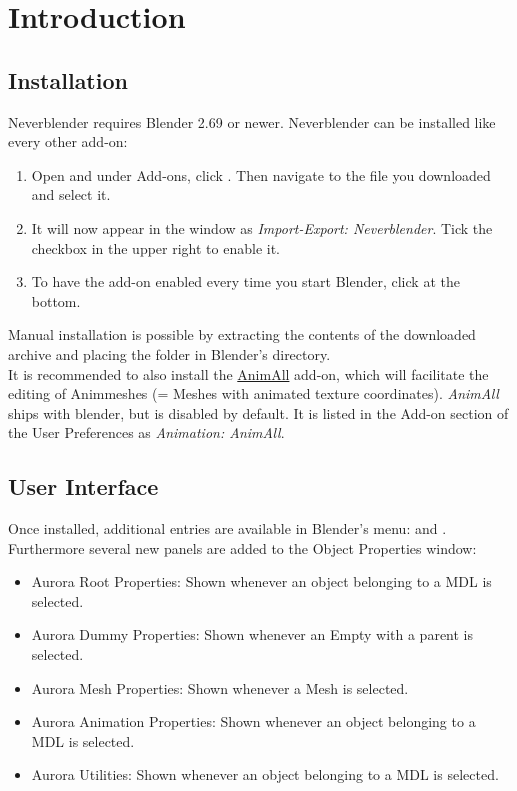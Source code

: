 \chapter{Introduction}

\section{Installation}
Neverblender requires Blender 2.69 or newer. Neverblender can be installed
like every other add-on: \\
\begin{enumerate}
\item Open  and under Add-ons, 
click . Then navigate to the file you downloaded and select it.
\item It will now appear in the window as \textit{Import-Export: Neverblender}. Tick the checkbox in the upper right to enable it.
\item To have the add-on enabled every time you start Blender, click  at the bottom.
\end{enumerate}
Manual installation is possible by extracting the contents of the downloaded archive and 
placing the  folder in Blender's  directory.\\

It is recommended to also install the \href{https://wiki.blender.org/index.php/Extensions:2.6/Py/Scripts/Animation/AnimAll}{AnimAll}  add-on, which will facilitate the editing of Animmeshes (= Meshes with animated texture coordinates). \textit{AnimAll} ships with blender, but is disabled by default. It is listed in the Add-on section of the User Preferences as \textit{Animation: AnimAll}.

\section{User Interface}
Once installed, additional entries are available in Blender's menu:  and 
. Furthermore several new panels are added to the Object Properties window:
\begin{itemize}
\item Aurora Root Properties: Shown whenever an object belonging to a MDL is selected.
\item Aurora Dummy Properties: Shown whenever an Empty with a parent is selected.
\item Aurora Mesh Properties: Shown whenever a Mesh is selected.
\item Aurora Animation Properties: Shown whenever an object belonging to a MDL is selected.
\item Aurora Utilities: Shown whenever an object belonging to a MDL is selected.
\end{itemize}